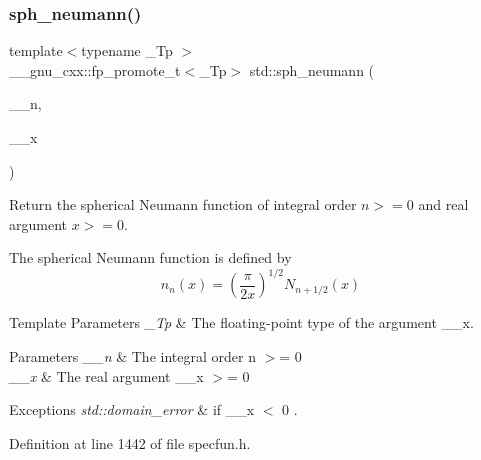 \subsubsection{\texorpdfstring{sph\+\_\+neumann()}{sph\_neumann()}}
{\footnotesize\ttfamily template$<$typename \+\_\+\+Tp $>$ \\
\+\_\+\+\_\+gnu\+\_\+cxx\+::fp\+\_\+promote\+\_\+t$<$\+\_\+\+Tp$>$ std\+::sph\+\_\+neumann (\begin{DoxyParamCaption}\item[{unsigned int}]{\+\_\+\+\_\+n,  }\item[{\+\_\+\+Tp}]{\+\_\+\+\_\+x }\end{DoxyParamCaption})\hspace{0.3cm}{\ttfamily [inline]}}

Return the spherical Neumann function of integral order $ n >= 0 $ and real argument $ x >= 0 $.

The spherical Neumann function is defined by \[ n_n(x) = \left(\frac{\pi}{2x} \right) ^{1/2} N_{n+1/2}(x) \]


\begin{DoxyTemplParams}{Template Parameters}
{\em \+\_\+\+Tp} & The floating-\/point type of the argument {\ttfamily \+\_\+\+\_\+x}. \\
\hline
\end{DoxyTemplParams}

\begin{DoxyParams}{Parameters}
{\em \+\_\+\+\_\+n} & The integral order {\ttfamily  n $>$= 0 } \\
\hline
{\em \+\_\+\+\_\+x} & The real argument {\ttfamily  \+\_\+\+\_\+x $>$= 0 } \\
\hline
\end{DoxyParams}

\begin{DoxyExceptions}{Exceptions}
{\em std\+::domain\+\_\+error} & if {\ttfamily  \+\_\+\+\_\+x $<$ 0 }. \\
\hline
\end{DoxyExceptions}


Definition at line 1442 of file specfun.\+h.

\mbox{\label{group__cxx17__math__spec__func_ga789143122fa99536329bc2d1b1aac2f0}} 
